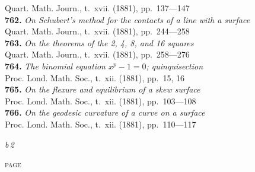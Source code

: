 \documentclass[12pt,a4paper,oneside]{book}
\begin{document}
\hspace*{2em}Quart. Math. Journ., t.~xvii. (1881), pp.~137---147\\[0.4em]
\textbf{762.} \textit{On Schubert's method for the contacts of a line with a surface} \\
\hspace*{2em}Quart. Math. Journ., t.~xvii. (1881), pp.~244---258\\[0.4em]
\textbf{763.} \textit{On the theorems of the 2, 4, 8, and 16 squares} \\
\hspace*{2em}Quart. Math. Journ., t.~xvii. (1881), pp.~258---276\\[0.4em]
\textbf{764.} \textit{The binomial equation $x^p - 1 = 0$; quinquisection} \\
\hspace*{2em}Proc. Lond. Math. Soc., t.~xii. (1881), pp.~15, 16\\[0.4em]
\textbf{765.} \textit{On the flexure and equilibrium of a skew surface} \\
\hspace*{2em}Proc. Lond. Math. Soc., t.~xii. (1881), pp.~103---108\\[0.4em]
\textbf{766.} \textit{On the geodesic curvature of a curve on a surface} \\
\hspace*{2em}Proc. Lond. Math. Soc., t.~xii. (1881), pp.~110---117

\begin{flushright}
\textit{b\,2}
\end{flushright}

\clearpage

\vspace*{1em}

\hfill\textsc{page}
\end{document}
